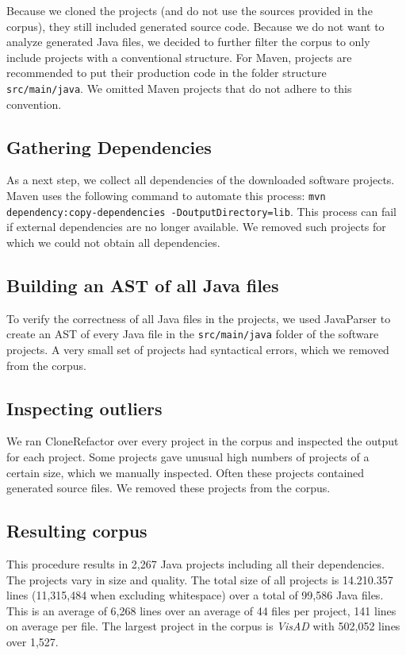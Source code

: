 Because we cloned the projects (and do not use the sources provided in the corpus), they still included generated source code. Because we do not want to analyze generated Java files, we decided to further filter the corpus to only include projects with a conventional structure. For Maven, projects are recommended to put their production code in the folder structure \texttt{src/main/java}. We omitted Maven projects that do not adhere to this convention.

\subsection{Gathering Dependencies}
As a next step, we collect all dependencies of the downloaded software projects. Maven uses the following command to automate this process: \texttt{mvn dependency:copy-dependencies -DoutputDirectory=lib}. This process can fail if external dependencies are no longer available. We removed such projects for which we could not obtain all dependencies.

\subsection{Building an AST of all Java files}
To verify the correctness of all Java files in the projects, we used JavaParser \cite{tomassetti2017javaparser} to create an AST of every Java file in the \texttt{src/main/java} folder of the software projects. A very small set of projects had syntactical errors, which we removed from the corpus.

\subsection{Inspecting outliers}
We ran CloneRefactor over every project in the corpus and inspected the output for each project. Some projects gave unusual high numbers of projects of a certain size, which we manually inspected. Often these projects contained generated source files. We removed these projects from the corpus.

\subsection{Resulting corpus}
This procedure results in 2,267 Java projects including all their dependencies. The projects vary in size and quality. The total size of all projects is 14.210.357 lines (11,315,484 when excluding whitespace) over a total of 99,586 Java files. This is an average of 6,268 lines over an average of 44 files per project, 141 lines on average per file. The largest project in the corpus is \textit{VisAD} with 502,052 lines over 1,527.

